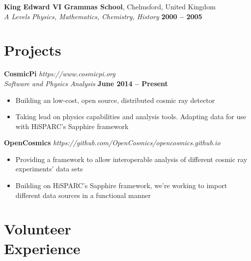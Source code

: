 \documentclass[margin,line]{resume}
\begin{document}
\begin{resume}
    \textbf{King Edward VI Grammas School}, Chelmsford, United Kingdom  \vspace{2mm}\\\vspace{1mm}%
    \textsl{A Levels Physics, Mathematics, Chemistry, History} \hfill \textbf{2000 -- 2005}\vspace{-3mm}\\\vspace{-1mm}%
\vspace{-1.5mm}

    \section{\mysidestyle Projects}


    \textbf{CosmicPi}  \hfill \textsl{https://www.cosmicpi.org}\\\vspace{1mm}%
    \textsl{Software and Physics Analysis} \hfill \textbf{June 2014 -- Present}\\
    \begin{itemize}
    \item{Building an low-cost, open source, distributed cosmic ray detector}
    \item{Taking lead on physics capabilities and analysis tools. Adapting data for use with HiSPARC's Sapphire framework}
    \end{itemize}

    \textbf{OpenCosmics} \hfill \textsl{https://github.com/OpenCosmics/opencosmics.github.io}\\\vspace{1mm}%
    \begin{itemize}
    \item{Providing a framework to allow interoperable analysis of different cosmic ray experiments' data sets}
    \item{Building on HiSPARC's Sapphire framework, we're working to import different data sources in a functional manner}
    \end{itemize}

    \section{\mysidestyle Volunteer\\Experience}



\end{resume}
\end{document}
